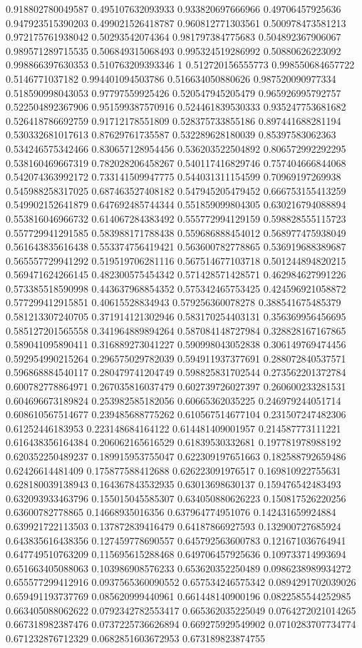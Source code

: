 \begin{table}
\begin{tabu}
\begin{sparkline}{10}
0.918802780049587 0.495107632093933 0.933820697666966 0.49706457925636 0.947923515390203 0.499021526418787 0.960812771303561 0.500978473581213 0.972175761938042 0.50293542074364 0.981797384775683 0.504892367906067 0.989571289715535 0.506849315068493 0.995324519286992 0.50880626223092 0.998866397630353 0.510763209393346 1 0.512720156555773 0.998550684657722 0.5146771037182 0.994401094503786 0.516634050880626 0.987520090977334 0.518590998043053 0.97797559925426 0.520547945205479 0.965926995792757 0.522504892367906 0.951599387570916 0.524461839530333 0.935247753681682 0.526418786692759 0.91712178551809 0.528375733855186 0.897441688281194 0.530332681017613 0.87629761735587 0.532289628180039 0.85397583062363 0.534246575342466 0.830657128954456 0.536203522504892 0.806572992292295 0.538160469667319 0.782028206458267 0.540117416829746 0.757404666844068 0.542074363992172 0.733141509947775 0.544031311154599 0.70969197269938 0.545988258317025 0.687463527408182 0.547945205479452 0.666753155413259 0.549902152641879 0.647692485744344 0.551859099804305 0.630216794088894 0.553816046966732 0.614067284383492 0.555772994129159 0.598828555115723 0.557729941291585 0.583988171788438 0.559686888454012 0.568977475938049 0.561643835616438 0.553374756419421 0.563600782778865 0.536919688389687 0.565557729941292 0.519519706281116 0.567514677103718 0.501244894820215 0.569471624266145 0.482300575454342 0.571428571428571 0.462984627991226 0.573385518590998 0.443637968854352 0.575342465753425 0.424596921058872 0.577299412915851 0.40615528834943 0.579256360078278 0.388541675485379 0.581213307240705 0.371914121302946 0.583170254403131 0.356369956456695 0.585127201565558 0.341964889894264 0.587084148727984 0.328828167167865 0.589041095890411 0.316889273041227 0.590998043052838 0.306149769474456 0.592954990215264 0.296575029782039 0.594911937377691 0.288072840537571 0.596868884540117 0.280479741204749 0.598825831702544 0.273562201372784 0.600782778864971 0.267035816037479 0.602739726027397 0.260600233281531 0.604696673189824 0.253982585182056 0.60665362035225 0.246979244051714 0.608610567514677 0.239485688775262 0.610567514677104 0.231507247482306 0.61252446183953 0.223148684164122 0.614481409001957 0.214587773111221 0.616438356164384 0.206062165616529 0.61839530332681 0.197781978988192 0.620352250489237 0.189915953755047 0.622309197651663 0.182588792659486 0.62426614481409 0.175877588412688 0.626223091976517 0.169810922755631 0.628180039138943 0.164367843532935 0.63013698630137 0.159476542483493 0.632093933463796 0.155015045585307 0.634050880626223 0.150817526220256 0.63600782778865 0.14668935016356 0.637964774951076 0.142431659924884 0.639921722113503 0.137872839416479 0.64187866927593 0.132900727685924 0.643835616438356 0.127459778690557 0.645792563600783 0.121671036764941 0.647749510763209 0.115695615288468 0.649706457925636 0.109733714993694 0.651663405088063 0.103986908576233 0.653620352250489 0.0986238989934272 0.655577299412916 0.0937565360090552 0.657534246575342 0.0894291702039026 0.659491193737769 0.085620999440961 0.661448140900196 0.0822585544252985 0.663405088062622 0.0792342782553417 0.665362035225049 0.0764272021014265 0.667318982387476 0.0737225736626894 0.669275929549902 0.0710283707734774 0.671232876712329 0.0682851603672953 0.673189823874755 
\end{sparkline}
\end{tabu}
\end{table}
